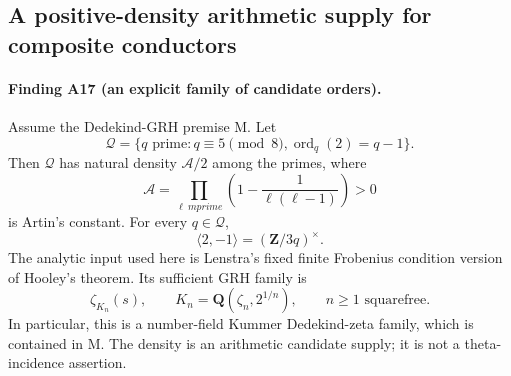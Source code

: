 \subsection{A positive-density arithmetic supply for composite conductors}
\label{sec:three-times-artin-prime}

\paragraph{Finding A17 (an explicit family of candidate orders).}
Assume the Dedekind-GRH premise M. Let
\[
 \mathcal Q=\{q\text{ prime}:q\equiv5\pmod8,
                         \operatorname{ord}_q(2)=q-1\}.
\]
Then $\mathcal Q$ has natural density $\mathcal A/2$ among the
primes, where
\[
 \mathcal A=\prod_{\ell\ {
m prime}}
                      \left(1-\frac1{\ell(\ell-1)}\right)>0
\]
is Artin's constant. For every $q\in\mathcal Q$,
\[
                  \langle2,-1\rangle=(\mathbf Z/3q)^\times.
                                                               \tag{AF.1}
\]
The analytic input used here is Lenstra's fixed finite Frobenius
condition version of Hooley's theorem. Its sufficient GRH family is
\[
 \zeta_{K_n}(s),\qquad
 K_n=\mathbf Q(\zeta_n,2^{1/n}),\qquad
 n\ge1\text{ squarefree}.                                    \tag{AF.2}
\]
In particular, this is a number-field Kummer Dedekind-zeta family,
which is contained in M. The density is an arithmetic candidate
supply; it is not a theta-incidence assertion.

